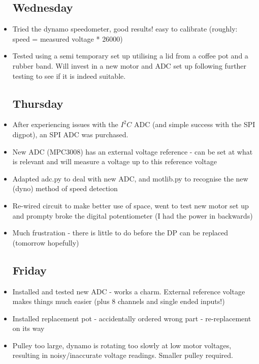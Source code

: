 \documentclass[a4]{report}
\def\thu{\subsection*{Thursday}}
\def\fri{\subsection*{Friday}}
\begin{document}
\begin{itemize}
		\subsection*{Wednesday}
		\item Tried the dynamo speedometer, good results! easy to calibrate (roughly: speed = measured voltage * 26000)
		\item Tested using a semi temporary set up utilising a lid from a coffee pot and a rubber band. Will invest in a new motor and ADC set up following further testing to see if it is indeed suitable.
		\thu
		\item After experiencing issues with the \(I^2C\) ADC (and simple success with the SPI digpot), an SPI ADC was purchased.
		\item New ADC (MPC3008) has an external voltage reference - can be set at what is relevant and will measure a voltage up to this reference voltage
		\item Adapted adc.py to deal with new ADC, and motlib.py to recognise the new (dyno) method of speed detection
		\item Re-wired circuit to make better use of space, went to test new motor set up and prompty broke the digital potentiometer (I had the power in backwards)
		\item Much frustration - there is little to do before the DP can be replaced (tomorrow hopefully)
		\fri
		\item Installed and tested new ADC - works a charm. External reference voltage makes things much easier (plus 8 channels and single ended inputs!)
		\item Installed replacement pot - accidentally ordered wrong part - re-replacement on its way
		\item Pulley too large, dynamo is rotating too slowly at low motor voltages, resulting in noisy/inaccurate voltage readings. Smaller pulley required.
	\end{itemize}
	\newpage
\end{document}

